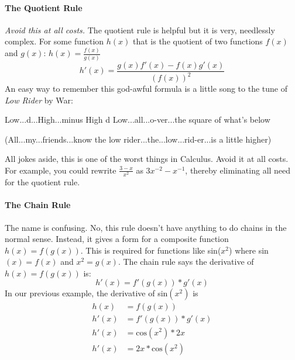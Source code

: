 \documentclass[../revisedmain.tex]{subfiles}
\begin{document}
\paragraph{The Quotient Rule} \textit{Avoid this at all costs.} The quotient rule is helpful but it is very, needlessly complex. For some function $h(x)$ that is the quotient of two functions $f(x)$ and $g(x)$: $h(x)=\displaystyle\frac{f(x)}{g(x)}$$$h'(x)=\frac{g(x)f'(x)-f(x)g'(x)}{(f(x))^2}$$ An easy way to remember this god-awful formula is a little song to the tune of \textit{Low Rider} by War:
\begin{displayquote}
	Low...d...High...minus High d Low...all...o-ver...the square of what's below 
\end{displayquote}
\begin{displayquote}
	(All...my...friends...know the low rider...the...low...rid-er...is a little higher)
\end{displayquote}
All jokes aside, this is one of the worst things in Calculus. Avoid it at all costs. For example, you could rewrite $\displaystyle\frac{3-x}{x^2}$ as $3x^{-2}-x^{-1}$, thereby eliminating all need for the quotient rule.
\paragraph{The Chain Rule} The name is confusing. No, this rule doesn't have anything to do chains in the normal sense. Instead, it gives a form for a composite function $h(x)=f(g(x))$. This is required for functions like sin($x^2$) where sin$(x)=f(x)$ and $x^2=g(x)$. The chain rule says the derivative of $h(x)=f(g(x))$ is:$$h'(x)=f'(g(x))*g'(x)$$In our previous example, the derivative of sin$(x^2)$ is
\begin{equation}
\begin{split}
h(x) &= f(g(x)) \\
h'(x) &= f'(g(x))*g'(x) \\
h'(x) &= \text{cos}(x^2)*2x \\
h'(x) &= 2x*\text{cos}(x^2)
\end{split}
\end{equation}
\end{document}
